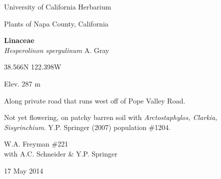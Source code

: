 \documentclass[letterpaper,10pt]{article}
\begin{document}
\begin{minipage}[t]{0.40\textwidth}

\begin{center}
University of California Herbarium \\
\begin{large}
Plants of Napa County, California \\
\end{large}
\vspace{\baselineskip}
\textbf{Linaceae} \\
\textit{Hesperolinon spergulinum} A. Gray\\
\end{center}

\begin{footnotesize}

\begin{multicols}{2}
38.566\textdegree N 122.398\textdegree W
\columnbreak
\begin{flushright}
Elev. 287 m
\end{flushright}
\end{multicols}

Along private road that runs west off of Pope Valley Road.
\vspace{\baselineskip}

Not yet flowering, on patchy barren soil with \textit{Arctostaphylos, Clarkia, Sisyrinchium}. Y.P. Springer (2007) population \#1204.

\begin{multicols}{2}
W.A. Freyman \#221 \\
with A.C. Schneider \& Y.P. Springer
\columnbreak
\begin{flushright}
17 May 2014
\end{flushright}
\end{multicols}

\end{footnotesize}

\end{minipage}
%
\hspace{2cm}
%
\end{document}
